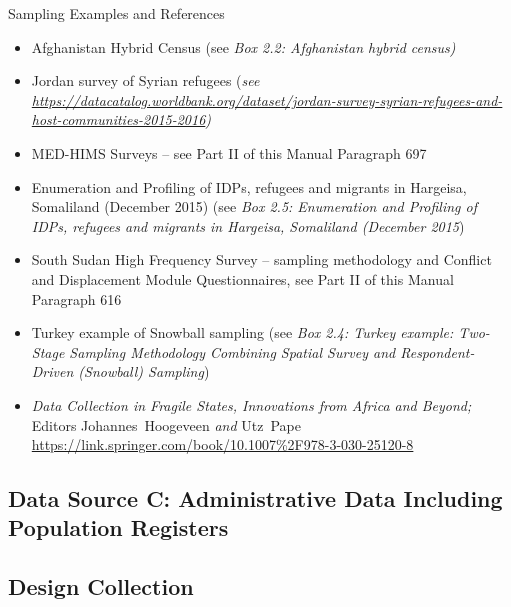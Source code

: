 \documentclass[
]{article}
\begin{document}
Sampling Examples and References

\begin{itemize}
\item
  Afghanistan Hybrid Census (see \emph{Box 2.2: Afghanistan hybrid census)}
\item
  Jordan survey of Syrian refugees (\emph{see
  \url{https://datacatalog.worldbank.org/dataset/jordan-survey-syrian-refugees-and-host-communities-2015-2016})}
\item
  MED-HIMS Surveys -- see Part II of this Manual Paragraph 697
\item
  Enumeration and Profiling of IDPs, refugees and migrants in
  Hargeisa, Somaliland (December 2015) (see \emph{Box 2.5: Enumeration and
  Profiling of IDPs, refugees and migrants in Hargeisa, Somaliland
  (December 2015})
\item
  South Sudan High Frequency Survey -- sampling methodology and
  Conflict and Displacement Module Questionnaires, see Part II of this
  Manual Paragraph 616
\item
  Turkey example of Snowball sampling (see \emph{Box 2.4: Turkey example:
  Two-Stage Sampling Methodology Combining Spatial Survey and
  Respondent-Driven (Snowball) Sampling})
\item
  \emph{Data Collection in Fragile States, Innovations from Africa and
  Beyond;} Editors Johannes~Hoogeveen \emph{and} Utz~Pape
  \url{https://link.springer.com/book/10.1007\%2F978-3-030-25120-8}
\end{itemize}

\hypertarget{data-source-c-administrative-data-including-population-registers}{%
\subsection{Data Source C: Administrative Data Including Population Registers}\label{data-source-c-administrative-data-including-population-registers}}

\hypertarget{design-collection-2}{%
\subsection{Design Collection}\label{design-collection-2}}
\end{document}
